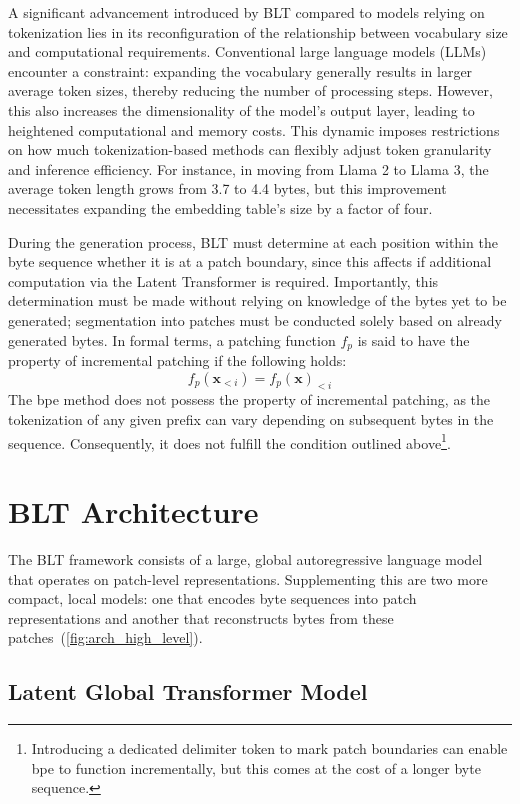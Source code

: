 A significant advancement introduced by {\textsc BLT} compared to models relying on tokenization lies in its reconfiguration of the relationship between vocabulary size and computational requirements. Conventional large language models (LLMs) encounter a constraint: expanding the vocabulary generally results in larger average token sizes, thereby reducing the number of processing steps. However, this also increases the dimensionality of the model's output layer, leading to heightened computational and memory costs. This dynamic imposes restrictions on how much tokenization-based methods can flexibly adjust token granularity and inference efficiency. For instance, in moving from Llama 2 to Llama 3, the average token length grows from 3.7 to 4.4 bytes, but this improvement necessitates expanding the embedding table’s size by a factor of four.

During the generation process, {\textsc BLT} must determine at each position within the byte sequence whether it is at a patch boundary, since this affects if additional computation via the Latent Transformer is required. Importantly, this determination must be made without relying on knowledge of the bytes yet to be generated; segmentation into patches must be conducted solely based on already generated bytes. In formal terms, a patching function $f_p$ is said to have the property of incremental patching if the following holds:
$$f_p(\pmb{x}_{<i}) = f_p(\pmb{x})_{<i}$$
The bpe method does not possess the property of incremental patching, as the tokenization of any given prefix can vary depending on subsequent bytes in the sequence. Consequently, it does not fulfill the condition outlined above\footnote{Introducing a dedicated delimiter token to mark patch boundaries can enable bpe to function incrementally, but this comes at the cost of a longer byte sequence.}.

\section{{\textsc BLT} Architecture}
\label{section:architecture}
The {\textsc BLT} framework consists of a large, global autoregressive language model that operates on patch-level representations. Supplementing this are two more compact, local models: one that encodes byte sequences into patch representations and another that reconstructs bytes from these patches~(\autoref{fig:arch_high_level}).

\subsection{Latent Global Transformer Model}

